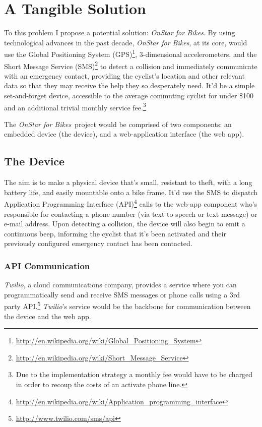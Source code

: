 \documentclass[titlepage]{article}
\newcommand{\onstar}{{\em OnStar for Bikes}}
\begin{document}
\section{A Tangible Solution}
To this problem I propose a potential solution: \onstar. By using technological advances in the past decade, \onstar, at its core, would use the Global Positioning System (GPS)\footnote{\url{http://en.wikipedia.org/wiki/Global_Positioning_System}}, 3-dimensional accelerometers, and the Short Message Service (SMS)\footnote{\url{http://en.wikipedia.org/wiki/Short_Message_Service}} to detect a collision and immediately communicate with an emergency contact, providing the cyclist's location and other relevant data so that they may receive the help they so desperately need. It'd be a simple set-and-forget device, accessible to the average commuting cyclist for under \$100 and an additional trivial monthly service fee.\footnote{Due to the implementation strategy a monthly fee would have to be charged in order to recoup the costs of an activate phone line.}

The \onstar\ project would be comprised of two components: an embedded device (the device), and a web-application interface (the web app).

\subsection{The Device}
The aim is to make a physical device that's small, resistant to theft, with a long battery life, and easily mountable onto a bike frame. It'd use the SMS to dispatch Application Programming Interface (API)\footnote{\url{http://en.wikipedia.org/wiki/Application_programming_interface}} calls to the web-app component who's responsible for contacting a phone number (via text-to-speech or text message) or e-mail address. Upon detecting a collision, the device will also begin to emit a continuous beep, informing the cyclist that it's been activated and their previously configured emergency contact has been contacted.

\subsubsection{API Communication}
{\em Twilio}, a cloud communications company, provides a service where you can programmatically send and receive SMS messages or phone calls using a 3rd party API.\footnote{\url{http://www.twilio.com/sms/api}} {\em Twilio}'s service would be the backbone for communication between the device and the web app.
\end{document}
